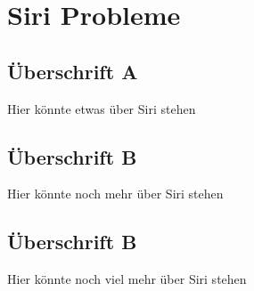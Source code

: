 \chapter{Siri Probleme}


\section{Überschrift A}
Hier könnte etwas über Siri stehen\\


\newpage
\section{Überschrift B}
Hier könnte noch mehr über Siri stehen\\


\section{Überschrift B}
Hier könnte noch viel mehr über Siri stehen\\